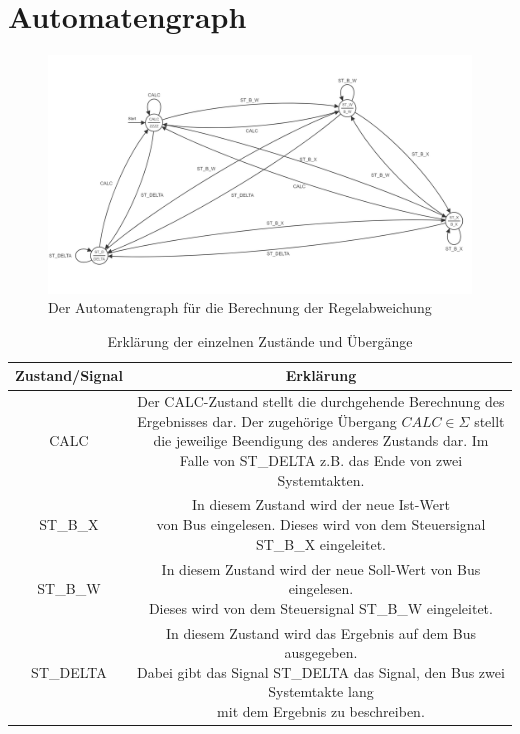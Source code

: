 \documentclass{report}
\begin{document}
\newpage

\section{Automatengraph}
\label{sec:automatengraph}

\begin{figure}[h]
  \centering
  \includegraphics[width=\textwidth]{../assets/images/DIHA/partBauto.png}
  \caption{Der Automatengraph für die Berechnung der Regelabweichung}
  \label{fig:autopartB}
\end{figure}



\begin{table}[h]
  \centering
  \begin{tabular}{|c|c|}
    \hline
    Zustand/Signal & Erklärung \\
    \hline
    CALC & \makecell{Der CALC-Zustand stellt die durchgehende Berechnung\\ des Ergebnisses dar. Der zugehörige Übergang $CALC\in\Sigma$\\ stellt die jeweilige Beendigung des anderes Zustands dar. Im Falle\\ von ST\_DELTA z.B. das Ende von zwei Systemtakten.} \\
    \hline
    ST\_B\_X & \makecell{In diesem Zustand wird der neue Ist-Wert\\ von Bus eingelesen. Dieses wird von dem Steuersignal ST\_B\_X eingeleitet.}\\
    \hline
    ST\_B\_W & \makecell{In diesem Zustand wird der neue Soll-Wert von Bus eingelesen.\\ Dieses wird von dem Steuersignal ST\_B\_W eingeleitet.}\\
    \hline
    ST\_DELTA & \makecell{In diesem Zustand wird das Ergebnis auf dem Bus ausgegeben.\\ Dabei gibt das Signal ST\_DELTA das Signal, den Bus zwei Systemtakte lang \\ mit dem Ergebnis zu beschreiben.} \\
    \hline
  \end{tabular}
  \caption{Erklärung der einzelnen Zustände und Übergänge}
  \label{tab:state}
\end{table}
\end{document}
